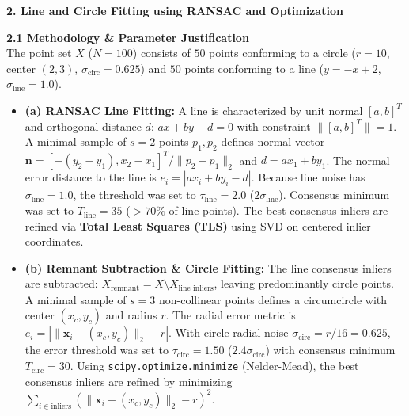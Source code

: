 \documentclass[10pt]{article}
\begin{document}
	\newpage
	\noindent\textbf{\large \color{uomaccent} 2. Line and Circle Fitting using RANSAC and Optimization}
	\vspace{0.1cm}
	
	\noindent\textbf{2.1 Methodology \& Parameter Justification} \\
	The point set $X$ ($N = 100$) consists of $50$ points conforming to a circle ($r = 10$, center $(2, 3)$, $\sigma_{\text{circ}} = 0.625$) and $50$ points conforming to a line ($y = -x + 2$, $\sigma_{\text{line}} = 1.0$).
	\begin{itemize}[leftmargin=*, nosep]
		\item \textbf{(a) RANSAC Line Fitting:} A line is characterized by unit normal $[a, b]^T$ and orthogonal distance $d$: $a x + b y - d = 0$ with constraint $\|[a, b]^T\| = 1$. A minimal sample of $s = 2$ points $p_1, p_2$ defines normal vector $\mathbf{n} = [-(y_2 - y_1), x_2 - x_1]^T / \|p_2 - p_1\|_2$ and $d = a x_1 + b y_1$. The normal error distance to the line is $e_i = |a x_i + b y_i - d|$. Because line noise has $\sigma_{\text{line}} = 1.0$, the threshold was set to $\tau_{\text{line}} = 2.0$ ($2\sigma_{\text{line}}$). Consensus minimum was set to $T_{\text{line}} = 35$ ($>70\%$ of line points). The best consensus inliers are refined via \textbf{Total Least Squares (TLS)} using SVD on centered inlier coordinates.
		\item \textbf{(b) Remnant Subtraction \& Circle Fitting:} The line consensus inliers are subtracted: $X_{\text{remnant}} = X \setminus X_{\text{line\_inliers}}$, leaving predominantly circle points. A minimal sample of $s = 3$ non-collinear points defines a circumcircle with center $(x_c, y_c)$ and radius $r$. The radial error metric is $e_i = |\|\mathbf{x}_i - (x_c, y_c)\|_2 - r|$. With circle radial noise $\sigma_{\text{circ}} = r/16 = 0.625$, the error threshold was set to $\tau_{\text{circ}} = 1.50$ ($2.4\sigma_{\text{circ}}$) with consensus minimum $T_{\text{circ}} = 30$. Using \texttt{scipy.optimize.minimize} (Nelder-Mead), the best consensus inliers are refined by minimizing $\sum_{i \in \text{inliers}} (\|\mathbf{x}_i - (x_c, y_c)\|_2 - r)^2$.
	\end{itemize}
\end{document}

